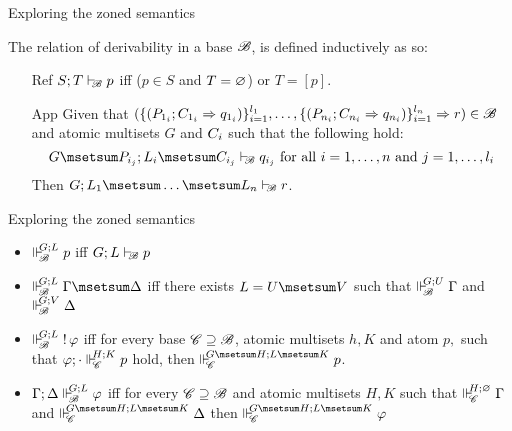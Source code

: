 \documentclass{beamer}
\begin{document}
\begin{frame}{Exploring the zoned semantics}
	\begin{definition}
		The relation of derivability in a base $\baseB$, is defined inductively as so:
		\begin{itemize}
		\item[Ref] $S;T \deriveBaseM{\baseB} p$ iff ($p \in S$ and $T=\emptymultiset$) or $T=[p]$.
		\item[App] Given that $(\openaddrule(P_{1_i};C_{1_i} \seq q_{1_{i}})\Closeaddrule{i=1}{l_1},\dots,\openaddrule(P_{n_i};C_{n_i} \seq q_{n_{i}}) \Closeaddrule{i=1}{l_n} \Rightarrow \at{r}) \in \baseB$ and atomic multisets $G$ and $\at{C}_i$ such that the following hold:
				\[G\msetsum P_{i_j};L_i\msetsum C_{i_j} \deriveBaseM{\baseB} \at{q}_{i_j} \text{ for all } i = 1,\dots, n \text{ and } j = 1,\dots,l_i\]
		Then $G;L_{1}\msetsum\dots\msetsum L_{n}\deriveBaseM{\baseB} r$. 
		\end{itemize}
	\end{definition}
\end{frame}
\begin{frame}{Exploring the zoned semantics}
\begin{itemize}
\item $\suppM{\baseB}{G;L}p$ iff $G;L\deriveBaseM{\baseB}p$
\vspace{0.3cm}
\item $\suppM{\baseB}{G;L}\Gamma\msetsum\Delta$ iff there exists $L=U\msetsum V$ such that $\suppM{\baseB}{G;U}\Gamma$ and $\suppM{\baseB}{G;V}\Delta$
\vspace{0.3cm}
\item $\suppM{\baseB}{G;L} \bang\varphi$ iff for every base $\baseC \baseGeq \baseB$, atomic multisets $h,K$ and atom $p,$ such that $\varphi;\cdot \suppM{\baseC}{H; K} p$ hold, then $\suppM{\baseC}{G\msetsum H; L\msetsum K}p$.
\vspace{0.3cm}
\item $\Gamma;\Delta\suppM{\baseB}{G;L}\varphi$ iff for every $\baseC \baseGeq \baseB$ and atomic multisets $H,K$ such that $\suppM{\baseC}{H;\emptymultiset}\Gamma$ and $\suppM{\baseC}{G\msetsum H;L\msetsum K}\Delta$ then $\suppM{\baseC}{G\msetsum H;L\msetsum K}\varphi$
\end{itemize}
\end{frame}
\end{document}
